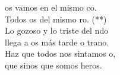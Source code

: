 \begin{cancion}%
	os vamos en el mismo co.\\
	Todos os del mismo ro. (**)\\
	Lo gozoso y lo triste del ndo\\
	llega a os más tarde o trano.\\
	Haz que todos nos sintamos o,\\
	que sinos que somos heros.\\
\end{cancion}%
